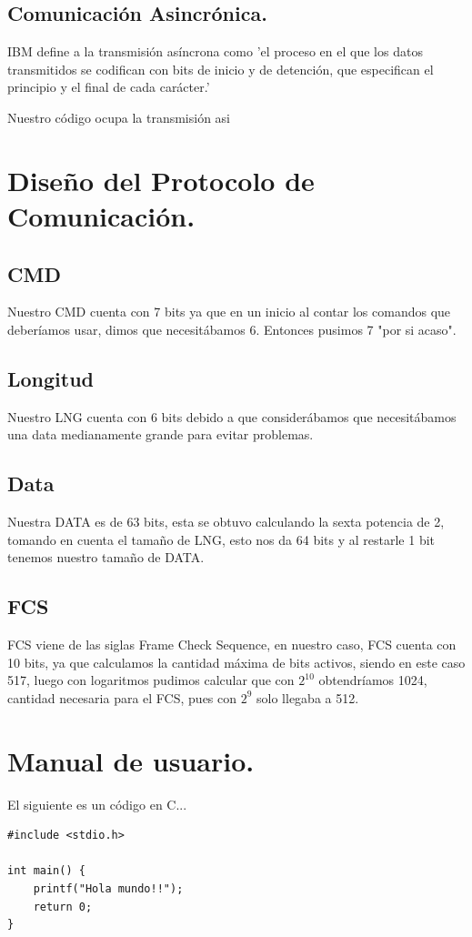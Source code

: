 \documentclass[12pt,letterpaper]{article}
\begin{document}
\subsection{Comunicación Asincrónica.}
IBM{\cite{IBM}} define a la transmisión asíncrona como 'el proceso en el que los datos transmitidos se codifican con bits de inicio y de detención, que especifican el principio y el final de cada carácter.'

Nuestro código ocupa la transmisión asi

\section{Diseño del Protocolo de Comunicación.}
\subsection{CMD}
Nuestro CMD cuenta con 7 bits ya que en un inicio al contar los comandos que deberíamos usar, dimos que necesitábamos 6. Entonces pusimos 7 "por si acaso".
\subsection{Longitud}
Nuestro LNG cuenta con 6 bits debido a que considerábamos que necesitábamos una data medianamente grande para evitar problemas.
\subsection{Data}
Nuestra DATA es de 63 bits, esta se obtuvo calculando la sexta potencia de 2, tomando en cuenta el tamaño de LNG, esto nos da 64 bits y al restarle 1 bit tenemos nuestro tamaño de DATA.
\subsection{FCS}
FCS viene de las siglas Frame Check Sequence, en nuestro caso, FCS cuenta con 10 bits, ya que calculamos la cantidad máxima de bits activos, siendo en este caso 517, luego con logaritmos pudimos calcular que con \(2^{10}\) obtendríamos 1024, cantidad necesaria para el FCS, pues con \(2^{9}\) solo llegaba a 512.


\section{Manual de usuario.}

El siguiente es un código en C...
\begin{lstlisting}[frame=single]
#include <stdio.h>

int main() {
	printf("Hola mundo!!");
	return 0;
}
\end{lstlisting}
\end{document}
